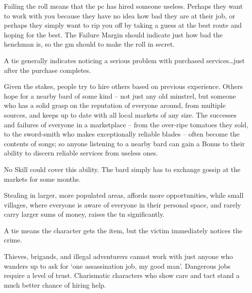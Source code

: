 \begin{multicols}{2}
Failing the roll means that the \gls{pc} has hired someone useless.
Perhaps they want to work with you because they have no idea how bad they are at their job, or perhaps they simply want to rip you off by taking a guess at the best route and hoping for the best.
The Failure Margin should indicate just how bad the henchman is, so the \gls{gm} should to make the roll in secret.

A tie generally indicates noticing a serious problem with purchased services\ldots just after the purchase completes.

Given the stakes, people try to hire others based on previous experience.
Others hope for a nearby bard of some kind -- not just any old minstrel, but someone who has a solid grasp on the reputation of everyone around, from multiple sources, and keeps up to date with all local markets of any size.
The successes and failures of everyone in a marketplace -- from the over-ripe tomatoes they sold, to the sword-smith who makes exceptionally reliable blades -- often become the contents of songs; so anyone listening to a nearby bard can gain a Bonus to their ability to discern reliable services from useless ones.

No Skill could cover this ability.
The bard simply has to exchange gossip at the markets for some months.

Stealing in larger, more populated areas, affords more opportunities, while small \glspl{village}, where everyone is aware of everyone in their personal space, and rarely carry larger sums of money, raises the \gls{tn} significantly.

A tie means the character gets the item, but the victim immediately notices the crime.

\larcenyChart

Thieves, brigands, and illegal adventurers cannot work with just anyone who wanders up to ask for `one assassination job, my good man'.
Dangerous jobs require a level of trust.
Charismatic characters who show care and tact stand a much better chance of hiring help.

\end{multicols}
